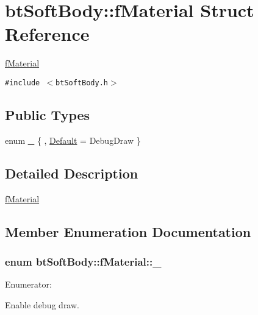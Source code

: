 \hypertarget{structbt_soft_body_1_1f_material}{
\section{btSoftBody::fMaterial Struct Reference}
\label{structbt_soft_body_1_1f_material}
}
\hyperlink{structbt_soft_body_1_1f_material}{fMaterial}  


{\tt \#include $<$btSoftBody.h$>$}

\subsection*{Public Types}
\begin{CompactItemize}
\item 
enum \hyperlink{structbt_soft_body_1_1f_material_6cc6df1c89b51761f169222062ec5ca8}{\_\-} \{ , \hyperlink{structbt_soft_body_1_1f_material_6cc6df1c89b51761f169222062ec5ca8f84f8e3bf24e47554c5278e654ddc0bb}{Default} =  DebugDraw
 \}
\end{CompactItemize}


\subsection{Detailed Description}
\hyperlink{structbt_soft_body_1_1f_material}{fMaterial} 

\subsection{Member Enumeration Documentation}
\hypertarget{structbt_soft_body_1_1f_material_6cc6df1c89b51761f169222062ec5ca8}{
\subsubsection[\_\-]{\setlength{\rightskip}{0pt plus 5cm}enum {\bf btSoftBody::fMaterial::\_\-}}}
\label{structbt_soft_body_1_1f_material_6cc6df1c89b51761f169222062ec5ca8}


\begin{Desc}
\item[Enumerator: ]\par
\begin{description}
\item[{\em 
\hypertarget{structbt_soft_body_1_1f_material_6cc6df1c89b51761f169222062ec5ca8f84f8e3bf24e47554c5278e654ddc0bb}{
Default}
\label{structbt_soft_body_1_1f_material_6cc6df1c89b51761f169222062ec5ca8f84f8e3bf24e47554c5278e654ddc0bb}
}]Enable debug draw. \end{description}
\end{Desc}



